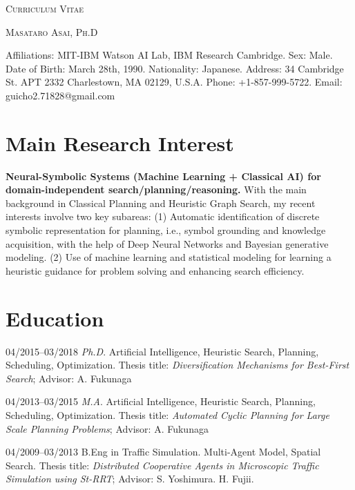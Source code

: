 


\pagestyle{empty}

\begin{center}
{\huge\textsc{Curriculum Vitae}}
\vspace{0.7\baselineskip}

{\Large\textsc{Masataro Asai, Ph.D}}
\vspace{0.5\baselineskip}

\small

 Affiliations: MIT-IBM Watson AI Lab, IBM Research Cambridge.
 Sex: Male. Date of Birth: March 28th, 1990. Nationality: Japanese.
 Address: 34 Cambridge St. APT 2332 Charlestown, MA 02129, U.S.A.
 Phone: +1-857-999-5722.
 Email: guicho2.71828@gmail.com
\end{center}

\section{Main Research Interest}

\textbf{Neural-Symbolic Systems (Machine Learning + Classical AI) for domain-independent search/planning/reasoning.}
With the main background in Classical Planning and
Heuristic Graph Search, my recent interests involve two key subareas:
(1) Automatic identification of discrete symbolic representation for planning, i.e.,
symbol grounding and knowledge acquisition, with the help of Deep Neural Networks and Bayesian generative modeling.
(2) Use of machine learning and statistical modeling for learning a heuristic guidance for problem solving and enhancing search efficiency.


\section{Education}

\begin{CV}
 \item[04/2015--03/2018] \textit{Ph.D}.
 Artificial Intelligence, Heuristic Search, Planning, Scheduling, Optimization.
 Thesis title: \emph{Diversification Mechanisms for Best-First Search};
 Advisor: A. Fukunaga

 \item[04/2013--03/2015] \textit{M.A}.
 Artificial Intelligence, Heuristic Search, Planning, Scheduling, Optimization.
 Thesis title: \emph{Automated Cyclic Planning for Large Scale Planning Problems};
 Advisor: A. Fukunaga

 \item[04/2009--03/2013] B.Eng in Traffic Simulation.
 Multi-Agent Model, Spatial Search.
 Thesis title: \emph{Distributed Cooperative Agents in Microscopic Traffic Simulation using St-RRT};
 Advisor: S. Yoshimura. H. Fujii.
\end{CV}


